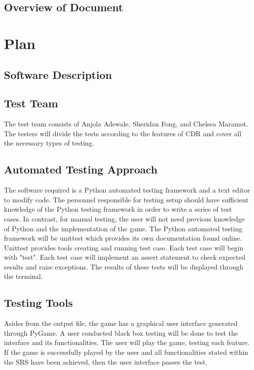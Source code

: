 \documentclass[12pt, titlepage]{article}
\begin{document}
	\subsection{Overview of Document}
	
	\section{Plan}
	
	\subsection{Software Description}
	
	\subsection{Test Team}
	
	The test team consists of Anjola Adewale, Sheridan Fong, and Chelsea Maramot. The testers will divide the tests according to the features of CDR and cover all the necessary types of testing.
	
	\subsection{Automated Testing Approach}
	
	The software required is a Python automated testing framework and a text editor to modify code. The personnel responsible for testing setup should have sufficient knowledge of the Python testing framework in order to write a series of test cases. In contrast, for manual testing, the user will not need previous knowledge of Python and the implementation of the game. The Python automated testing framework will be unittest which provides its own documentation found online. Unittest provides tools creating and running test case. Each test case will begin with "test". Each test case will implement an assert statement to check expected results and raise exceptions. The results of these tests will be displayed through the terminal.
	
	
	\subsection{Testing Tools}
	
	Asides from the output file, the game has a graphical user interface generated through PyGame. A user conducted black box testing will be done to test the interface and its functionalities. The user will play the game, testing each feature. If the game is successfully played by the user and all functionalities stated within the SRS have been achieved, then the user interface passes the test.
	
\end{document}
